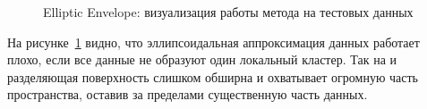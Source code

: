 \documentclass[12pt]{article}
\begin{document}
    \begin{figure}[h!]
        \centering
        \caption{Elliptic Envelope: визуализация работы метода на тестовых данных}
        \label{sec:Research:Model:Visualization:fig:EllipticEnvelope}
    \end{figure}

    \par На рисунке~\ref{sec:Research:Model:Visualization:fig:EllipticEnvelope} видно, что эллипсоидальная аппроксимация данных работает плохо, если все данные не образуют один локальный кластер. Так на  и  разделяющая поверхность слишком обширна и охватывает огромную часть пространства, оставив за пределами существенную часть данных.
\end{document}
